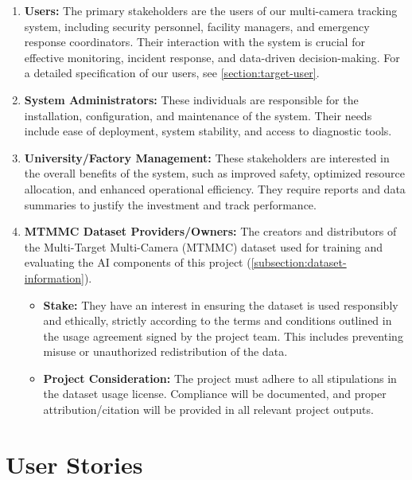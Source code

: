 \begin{enumerate}[leftmargin=80pt]
    \item \textbf{Users:} The primary stakeholders are the users of our multi-camera tracking system, including security personnel, facility managers, and emergency response coordinators. Their interaction with the system is crucial for effective monitoring, incident response, and data-driven decision-making. For a detailed specification of our users, see \ref{section:target-user}.
    \item \textbf{System Administrators:}  These individuals are responsible for the installation, configuration, and maintenance of the system.  Their needs include ease of deployment, system stability, and access to diagnostic tools.
    \item \textbf{University/Factory Management:}  These stakeholders are interested in the overall benefits of the system, such as improved safety, optimized resource allocation, and enhanced operational efficiency.  They require reports and data summaries to justify the investment and track performance.
    \item \textbf{MTMMC Dataset Providers/Owners:} The creators and distributors of the Multi-Target Multi-Camera (MTMMC) dataset used for training and evaluating the AI components of this project (\ref{subsection:dataset-information}).
        \begin{itemize}
            \item \textbf{Stake:} They have an interest in ensuring the dataset is used responsibly and ethically, strictly according to the terms and conditions outlined in the usage agreement signed by the project team. This includes preventing misuse or unauthorized redistribution of the data.
            \item \textbf{Project Consideration:} The project must adhere to all stipulations in the dataset usage license. Compliance will be documented, and proper attribution/citation will be provided in all relevant project outputs.
        \end{itemize}
\end{enumerate}

\section{User Stories}
\label{section:user-stories}



